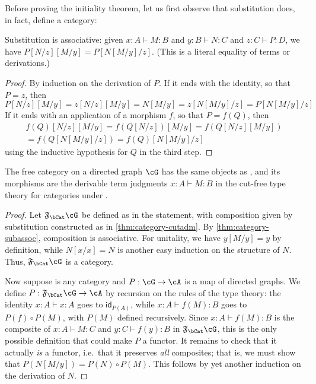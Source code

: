 \documentclass{book}
\def\idfunc{\mathsf{id}}
\let\types\vdash
\newcommand{\F}[1]{\mathfrak{F}_{#1}}
\begin{document}
Before proving the initiality theorem, let us first observe that substitution does, in fact, define a category:

\begin{lem}\label{thm:category-subassoc}
  Substitution is associative: given $x:A\types M:B$ and $y:B\types N:C$ and $z:C\types P:D$, we have $P[N/z][M/y] = P[N[M/y]/z]$.
  (This is a literal equality of terms or derivations.)
\end{lem}
\begin{proof}
  By induction on the derivation of $P$.
  If it ends with the identity, so that $P=z$, then
  \[P[N/z][M/y] = z[N/z][M/y] = N[M/y] = z[N[M/y]/z] = P[N[M/y]/z] \]
  If it ends with an application of a morphism $f$, so that $P = f(Q)$, then
  \begin{multline*}
    f(Q)[N/z][M/y] = f(Q[N/z])[M/y] = f(Q[N/z][M/y])\\
    = f(Q[N[M/y]/z]) = f(Q)[N[M/y]/z]
  \end{multline*}
  using the inductive hypothesis for $Q$ in the third step.
\end{proof}

\begin{thm}\label{thm:category-initial-2}
  The free category on a directed graph $\cG$ has the same objects as \cG, and its morphisms are the derivable term judgments $x:A\types M:B$ in the cut-free type theory for categories under \cG.
\end{thm}
\begin{proof}
  Let $\F\bCat\cG$ be defined as in the statement, with composition given by substitution constructed as in \cref{thm:category-cutadm}.
  By \cref{thm:category-subassoc}, composition is associative.
  For unitality, we have $y[M/y] = y$ by definition, while $N[x/x] = N$ is another easy induction on the structure of $N$.
  Thus, $\F\bCat\cG$ is a category.

  Now suppose \cA is any category and $P:\cG\to\cA$ is a map of directed graphs.
  We define $P:\F\bCat\cG \to\cA$ by recursion on the rules of the type theory: the identity $x:A\types x:A$ goes to $\idfunc_{P(A)}$, while $x:A\types f(M):B$ goes to $P(f) \circ P(M)$, with $P(M)$ defined recursively.
  Since $x:A\types f(M):B$ is the composite of $x:A\types M:C$ and $y:C\types f(y):B$ in $\F\bCat\cG$, this is the only possible definition that could make $P$ a functor.
  It remains to check that it actually \emph{is} a functor, i.e.\ that it preserves \emph{all} composites; that is, we must show that $P(N[M/y]) = P(N) \circ P(M)$.
  This follows by yet another induction on the derivation of $N$.
\end{proof}
\end{document}
